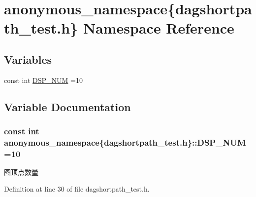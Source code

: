 \hypertarget{namespaceanonymous__namespace_02dagshortpath__test_8h_03}{}\section{anonymous\+\_\+namespace\{dagshortpath\+\_\+test.\+h\} Namespace Reference}
\label{namespaceanonymous__namespace_02dagshortpath__test_8h_03}
\subsection*{Variables}
\begin{DoxyCompactItemize}
\item 
const int \hyperlink{namespaceanonymous__namespace_02dagshortpath__test_8h_03_ae634f10497308a5f39bfb00eed214a21}{D\+S\+P\+\_\+\+N\+U\+M} =10
\end{DoxyCompactItemize}


\subsection{Variable Documentation}
\hypertarget{namespaceanonymous__namespace_02dagshortpath__test_8h_03_ae634f10497308a5f39bfb00eed214a21}{}
\subsubsection[{D\+S\+P\+\_\+\+N\+U\+M}]{\setlength{\rightskip}{0pt plus 5cm}const int anonymous\+\_\+namespace\{dagshortpath\+\_\+test.\+h\}\+::D\+S\+P\+\_\+\+N\+U\+M =10}\label{namespaceanonymous__namespace_02dagshortpath__test_8h_03_ae634f10497308a5f39bfb00eed214a21}
图顶点数量 

Definition at line 30 of file dagshortpath\+\_\+test.\+h.

